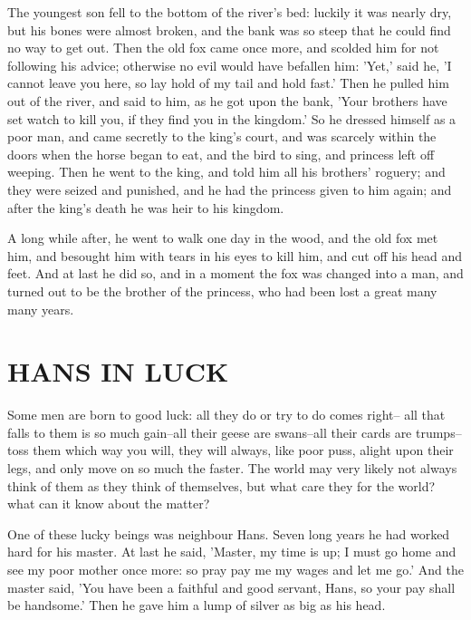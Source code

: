 \documentclass[12pt]{book}
\begin{document}
The youngest son fell to the bottom of the river's bed: luckily it was
nearly dry, but his bones were almost broken, and the bank was so
steep that he could find no way to get out. Then the old fox came once
more, and scolded him for not following his advice; otherwise no evil
would have befallen him: 'Yet,' said he, 'I cannot leave you here, so
lay hold of my tail and hold fast.' Then he pulled him out of the
river, and said to him, as he got upon the bank, 'Your brothers have
set watch to kill you, if they find you in the kingdom.' So he dressed
himself as a poor man, and came secretly to the king's court, and was
scarcely within the doors when the horse began to eat, and the bird to
sing, and princess left off weeping. Then he went to the king, and
told him all his brothers' roguery; and they were seized and punished,
and he had the princess given to him again; and after the king's death
he was heir to his kingdom.

A long while after, he went to walk one day in the wood, and the old
fox met him, and besought him with tears in his eyes to kill him, and
cut off his head and feet. And at last he did so, and in a moment the
fox was changed into a man, and turned out to be the brother of the
princess, who had been lost a great many many years.



\chapter{HANS IN LUCK}

Some men are born to good luck: all they do or try to do comes right--
all that falls to them is so much gain--all their geese are swans--all
their cards are trumps--toss them which way you will, they will
always, like poor puss, alight upon their legs, and only move on so
much the faster. The world may very likely not always think of them as
they think of themselves, but what care they for the world? what can
it know about the matter?

One of these lucky beings was neighbour Hans. Seven long years he had
worked hard for his master. At last he said, 'Master, my time is up; I
must go home and see my poor mother once more: so pray pay me my wages
and let me go.' And the master said, 'You have been a faithful and
good servant, Hans, so your pay shall be handsome.' Then he gave him a
lump of silver as big as his head.
\end{document}

